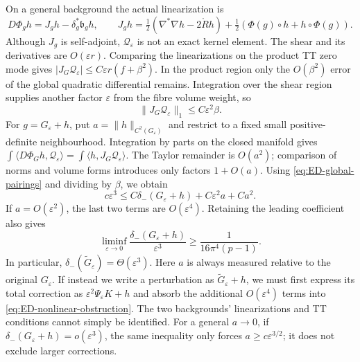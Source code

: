 \documentclass[a4paper,11pt]{article}
\numberwithin{equation}{section}
\theoremstyle{definition}
\begin{document}
On a general background the actual linearization is
\[
D\Phi_gh=J_gh-\delta_g^*\mathfrak b_gh,\qquad
J_gh=\tfrac12(\nabla^*\nabla h-2\mathring Rh)
+\tfrac12(\Phi(g)\circ h+h\circ\Phi(g)).
\]
Although $J_g$ is self-adjoint, $\mathcal Q_\varepsilon$ is not an exact kernel element.
The shear and its derivatives are $O(\varepsilon r)$.
Comparing the linearizations on the product TT zero mode gives
$|J_G\mathcal Q_\varepsilon|\le C\varepsilon r(f+\beta^2)$.
In the product region only the $O(\beta^2)$ error of the global quadratic differential remains.
Integration over the shear region supplies another factor $\varepsilon$ from the fibre volume weight, so
\[
\|J_G\mathcal Q_\varepsilon\|_1\le C\varepsilon^2\beta.
\]
For $g=G_\varepsilon+h$, put $a=\|h\|_{C^2(G_\varepsilon)}$ and restrict to a fixed small positive-definite neighbourhood.
Integration by parts on the closed manifold gives
$\int\langle D\Phi_Gh,\mathcal Q_\varepsilon\rangle
=\int\langle h,J_G\mathcal Q_\varepsilon\rangle$.
The Taylor remainder is $O(a^2)$; comparison of norms and volume forms introduces only factors $1+O(a)$.
Using \eqref{eq:ED-global-pairings} and dividing by $\beta$, we obtain
\begin{equation}\label{eq:ED-nonlinear-obstruction}
c\varepsilon^3\le C\delta_-(G_\varepsilon+h)+C\varepsilon^2a+Ca^2.
\end{equation}
If $a=O(\varepsilon^2)$, the last two terms are $O(\varepsilon^4)$.
Retaining the leading coefficient also gives
\begin{equation}\label{eq:ED-third-lower}
\liminf_{\varepsilon\to0}
\frac{\delta_-(G_\varepsilon+h)}{\varepsilon^3}
\ge\frac1{16\pi^4(p-1)}.
\end{equation}
In particular, $\delta_-(\widetilde G_\varepsilon)=\Theta(\varepsilon^3)$.
Here $a$ is always measured relative to the original $G_\varepsilon$.
If instead we write a perturbation as $\widetilde G_\varepsilon+h$,
we must first express its total correction as $\varepsilon^2\Psi_\varepsilon K+h$
and absorb the additional $O(\varepsilon^4)$ terms into \eqref{eq:ED-nonlinear-obstruction}.
The two backgrounds' linearizations and TT conditions cannot simply be identified.
For a general $a\to0$, if $\delta_-(G_\varepsilon+h)=o(\varepsilon^3)$,
the same inequality only forces $a\ge c\varepsilon^{3/2}$; it does not exclude larger corrections.
\end{document}
